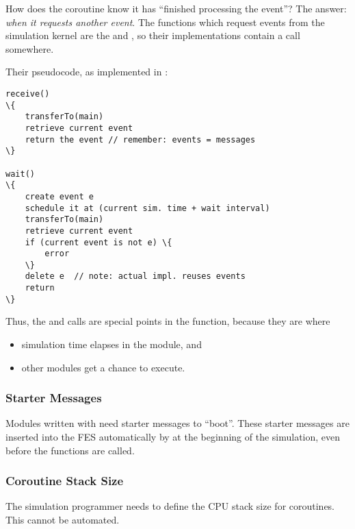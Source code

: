 How does the coroutine know it has ``finished processing the event''?
The answer: \textit{when it requests another event}.  The functions
which request events from the simulation kernel are the
 and , so their
implementations contain a  call
somewhere.


Their pseudocode, as implemented in {\opp}:


\begin{Verbatim}[commandchars=\\\{\}]
receive()
\{
    transferTo(main)
    retrieve current event
    return the event // remember: events = messages
\}

wait()
\{
    create event e
    schedule it at (current sim. time + wait interval)
    transferTo(main)
    retrieve current event
    if (current event is not e) \{
        error
    \}
    delete e  // note: actual impl. reuses events
    return
\}
\end{Verbatim}



Thus, the  and  calls are
special points in the  function, because
they are where

\begin{itemize}
  \item simulation time elapses in the module, and
  \item other modules get a chance to execute.
\end{itemize}


\subsubsection{Starter Messages}
\label{simple-modules:activity:starter-messages}

Modules written with  need starter
messages to ``boot''.  These starter messages
are inserted into the FES automatically by {\opp} at the
beginning of the simulation, even before the 
functions are called.


\subsubsection{Coroutine Stack Size}
\label{sec:simple-modules:activity:stack-size}

The simulation programmer needs to define the CPU stack size
for coroutines. This cannot be automated.

